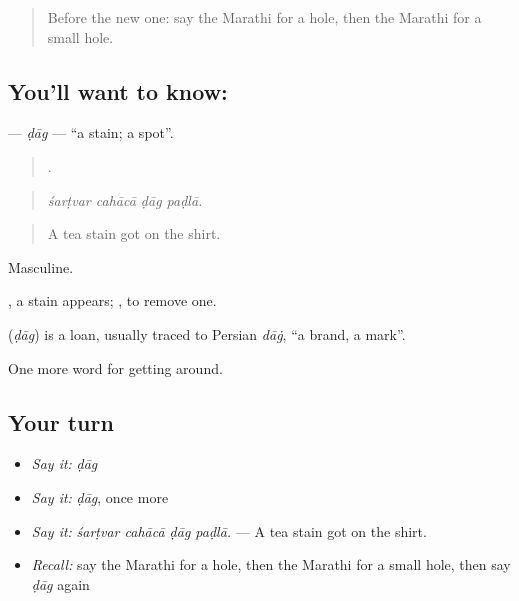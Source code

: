 \label{lesson:MR-C432-dag}



\begin{quote}
Before the new one: say the Marathi for a hole, then the Marathi for a small hole.
\end{quote}

\subsection*{You'll want to know: }
\textbf{} — \emph{ḍāg} — \textquotedblleft{}a stain; a spot\textquotedblright{}.

\begin{quote}
   .
\end{quote}

\begin{quote}
\emph{śarṭvar cahācā ḍāg paḍlā.}
\end{quote}

\begin{quote}
A tea stain got on the shirt.
\end{quote}

Masculine.

 , a stain appears;  , to remove one.

\begin{cousinweb}
\textbf{} (\emph{ḍāg}) is a loan, usually traced to Persian \emph{dāġ}, \textquotedblleft{}a brand, a mark\textquotedblright{}.
\end{cousinweb}

\begin{grammarlens}[title={What you've built}]
One more word for getting around.
\end{grammarlens}

\subsection*{Your turn}
\begin{itemize}
\raggedright
  \item \emph{Say it:} \emph{ḍāg}
  \item \emph{Say it:} \emph{ḍāg}, once more
  \item \emph{Say it:} \emph{śarṭvar cahācā ḍāg paḍlā.} — A tea stain got on the shirt.
  \item \emph{Recall:} say the Marathi for a hole, then the Marathi for a small hole, then say \emph{ḍāg} again
\end{itemize}

